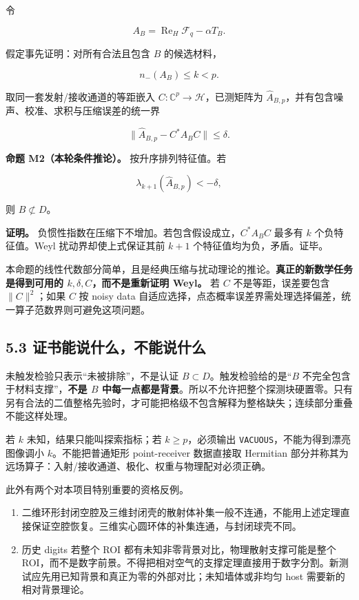 \documentclass[11pt,a4paper]{article}
\newcommand{\tightlist}{\setlength{\itemsep}{0pt}\setlength{\parskip}{0pt}}
\begin{document}
令

\[
A_B=\operatorname{Re}_H\mathcal F_q-\alpha T_B.
\]

假定事先证明：对所有合法且包含 \(B\) 的候选材料，

\[
n_-(A_B)\le k<p.
\]

取同一套发射/接收通道的等距嵌入
\(C:\mathbb C^p\to\mathcal H\)，已测矩阵为
\(\widehat A_{B,p}\)，并有包含噪声、校准、求积与压缩误差的统一界

\[
\|\widehat A_{B,p}-C^*A_BC\|\le\delta.
\]

\textbf{命题 M2（本轮条件推论）。} 按升序排列特征值。若

\[
\boxed{\lambda_{k+1}(\widehat A_{B,p})<-\delta,}
\]

则 \(B\not\subset D\)。

\textbf{证明。} 负惯性指数在压缩下不增加。若包含假设成立，\(C^*A_BC\)
最多有 \(k\) 个负特征值。Weyl 扰动界却使上式保证其前 \(k+1\)
个特征值均为负，矛盾。证毕。

本命题的线性代数部分简单，且是经典压缩与扰动理论的推论。\textbf{真正的新数学任务是得到可用的
\(k,\delta,C\)，而不是重新证明 Weyl。} 若 \(C\) 不是等距，误差要包含
\(\|C\|^2\)；如果 \(C\) 按 noisy data
自适应选择，点态概率误差界需处理选择偏差，统一算子范数界则可避免这项问题。

\hypertarget{ux8bc1ux4e66ux80fdux8bf4ux4ec0ux4e48ux4e0dux80fdux8bf4ux4ec0ux4e48}{%
\subsection{5.3
证书能说什么，不能说什么}\label{ux8bc1ux4e66ux80fdux8bf4ux4ec0ux4e48ux4e0dux80fdux8bf4ux4ec0ux4e48}}

未触发检验只表示``未被排除''，不是认证
\(B\subset D\)。触发检验给的是``\(B\)
不完全包含于材料支撑''，\textbf{不是 \(B\)
中每一点都是背景}。所以不允许把整个探测块硬置零。只有另有合法的二值整格先验时，才可能把格级不包含解释为整格缺失；连续部分重叠不能这样处理。

若 \(k\) 未知，结果只能叫探索指标；若 \(k\ge p\)，必须输出
\texttt{VACUOUS}，不能为得到漂亮图像调小 \(k\)。不能把普通矩形
point-receiver 数据直接取 Hermitian
部分并称其为远场算子：入射/接收通道、极化、权重与物理配对必须正确。

此外有两个对本项目特别重要的资格反例。

\begin{enumerate}
\def\labelenumi{\arabic{enumi}.}
\tightlist
\item
  二维环形封闭空腔及三维封闭壳的散射体补集一般不连通，不能用上述定理直接保证空腔恢复。三维实心圆环体的补集连通，与封闭球壳不同。
\item
  历史 digits 若整个 ROI 都有未知非零背景对比，物理散射支撑可能是整个
  ROI，而不是数字前景。不得把相对空气的支撑定理直接用于数字分割。新测试应先用已知背景和真正为零的外部对比；未知墙体或非均匀
  host 需要新的相对背景理论。
\end{enumerate}
\end{document}
